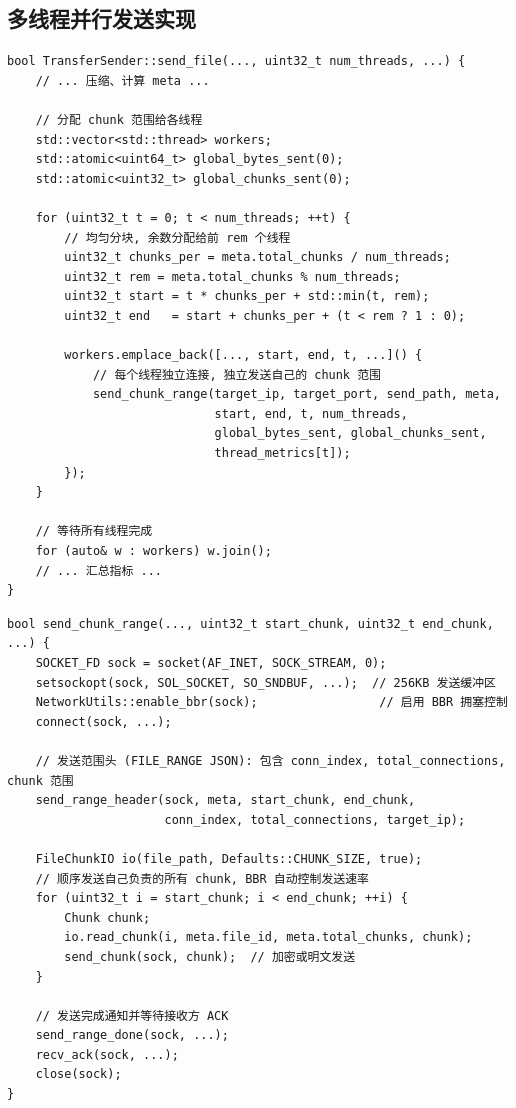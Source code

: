 \documentclass[12pt]{article}
\begin{document}
\subsection{多线程并行发送实现}

\begin{lstlisting}[caption={多线程并行发送主流程 (transfer\_sender.cpp)},label={lst:multi}]
bool TransferSender::send_file(..., uint32_t num_threads, ...) {
    // ... 压缩、计算 meta ...

    // 分配 chunk 范围给各线程
    std::vector<std::thread> workers;
    std::atomic<uint64_t> global_bytes_sent(0);
    std::atomic<uint32_t> global_chunks_sent(0);

    for (uint32_t t = 0; t < num_threads; ++t) {
        // 均匀分块, 余数分配给前 rem 个线程
        uint32_t chunks_per = meta.total_chunks / num_threads;
        uint32_t rem = meta.total_chunks % num_threads;
        uint32_t start = t * chunks_per + std::min(t, rem);
        uint32_t end   = start + chunks_per + (t < rem ? 1 : 0);

        workers.emplace_back([..., start, end, t, ...]() {
            // 每个线程独立连接, 独立发送自己的 chunk 范围
            send_chunk_range(target_ip, target_port, send_path, meta,
                             start, end, t, num_threads,
                             global_bytes_sent, global_chunks_sent,
                             thread_metrics[t]);
        });
    }

    // 等待所有线程完成
    for (auto& w : workers) w.join();
    // ... 汇总指标 ...
}
\end{lstlisting}

\begin{lstlisting}[caption={单线程发送范围 (transfer\_sender.cpp)},label={lst:range}]
bool send_chunk_range(..., uint32_t start_chunk, uint32_t end_chunk, ...) {
    SOCKET_FD sock = socket(AF_INET, SOCK_STREAM, 0);
    setsockopt(sock, SOL_SOCKET, SO_SNDBUF, ...);  // 256KB 发送缓冲区
    NetworkUtils::enable_bbr(sock);                 // 启用 BBR 拥塞控制
    connect(sock, ...);

    // 发送范围头 (FILE_RANGE JSON): 包含 conn_index, total_connections, chunk 范围
    send_range_header(sock, meta, start_chunk, end_chunk,
                      conn_index, total_connections, target_ip);

    FileChunkIO io(file_path, Defaults::CHUNK_SIZE, true);
    // 顺序发送自己负责的所有 chunk, BBR 自动控制发送速率
    for (uint32_t i = start_chunk; i < end_chunk; ++i) {
        Chunk chunk;
        io.read_chunk(i, meta.file_id, meta.total_chunks, chunk);
        send_chunk(sock, chunk);  // 加密或明文发送
    }

    // 发送完成通知并等待接收方 ACK
    send_range_done(sock, ...);
    recv_ack(sock, ...);
    close(sock);
}
\end{lstlisting}
\end{document}
